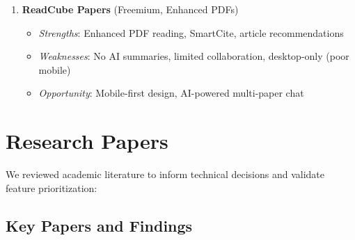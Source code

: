\begin{enumerate}
    \item \textbf{ReadCube Papers} (Freemium, Enhanced PDFs)
          \begin{itemize}
              \item \textit{Strengths}: Enhanced PDF reading, SmartCite, article recommendations
              \item \textit{Weaknesses}: No AI summaries, limited collaboration, desktop-only (poor mobile)
              \item \textit{Opportunity}: Mobile-first design, AI-powered multi-paper chat
          \end{itemize}
\end{enumerate}

\section{Research Papers}

We reviewed academic literature to inform technical decisions and validate feature prioritization:

\subsection{Key Papers and Findings}

